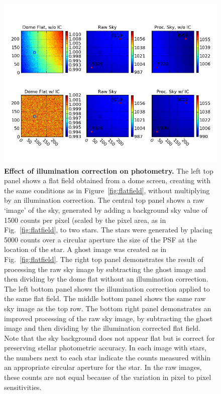 \documentclass[12pt,preprint]{aastex}
\begin{document}
\begin{figure}[htbp]
\includegraphics[width=6in]{ICeffect}
\caption{ {\small
{\bf Effect of illumination correction on photometry.}
The left top panel shows a flat field obtained from a dome screen,
creating with the same conditions as in Figure~\ref{fig:flatfield},
without multiplying by an illumination correction. The central top
panel shows a raw `image' of the sky, generated by adding a background
sky value of 1500 counts per pixel (scaled by the pixel area, as in
Fig.~\ref{fig:flatfield}, to two stars. The stars were generated by
placing 5000 counts over a circular aperture the size of the PSF at
the location of the star. A ghost image was created as in
Fig.~\ref{fig:flatfield}.  The right top panel demonstrates the result
of processing the raw sky image by subtracting the ghost image and
then dividing by the dome flat without an
illumination correction. 
The left bottom panel shows the illumination correction applied to the
same flat field. The middle bottom panel shows the same raw sky image as
the top row. The bottom right panel demonstrates an improved processing
of the raw sky image, by subtracting the ghost image and then dividing
by the illumination corrected flat field. 
Note that the sky background does not appear
flat but is correct for preserving stellar photometric accuracy. 
In each image with stars, the numbers next to each star indicate the
counts measured within an appropriate circular aperture for the
star. In the raw images, these counts are not equal because of the
variation in pixel to pixel sensitivities.  \label{fig:iceffect}
}}
\end{figure}
\end{document}
